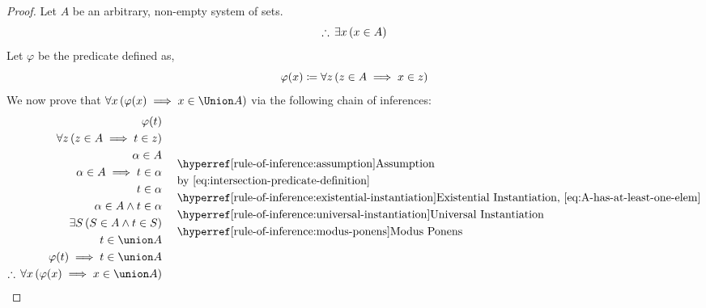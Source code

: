 \begin{proof}
    Let \( A \) be an arbitrary, non-empty system of sets.
    \begin{equation}
        \label{eq:A-has-at-least-one-elem}
        \therefore \, \exists x \, \mleft( x \in A \mright)
    \end{equation}
    Let \( \varphi \) be the predicate defined as,
    \begin{equation}
        \label{eq:intersection-predicate-definition}
        \varphi(x) \coloneq \forall z \, \mleft( z \in A \implies x \in z \mright)
    \end{equation}
    We now prove that \( \forall x \, \mleft( \varphi(x) \implies x \in \Union A \mright) \)
    via the following chain of inferences:
    \begin{equation*}
        \begin{aligned}
            \varphi(t)&\\
            \forall z \, \mleft( z \in A \implies t \in z \mright)&\\
            \alpha \in A& \\
            \alpha \in A \implies t \in \alpha & \\
            t \in \alpha& \\
            \alpha \in A \land t \in \alpha& \\
            \exists S \, \mleft( S \in A \land t \in S \mright)& \\
            t \in \union A& \\
            \varphi(t) \implies t \in \union A& \\
            \therefore \, \forall x \, \mleft( \varphi(x) \implies x \in \union A \mright)& \\
        \end{aligned}
        \text{  }
        \begin{aligned}
            &\quad\text{\aref{rule-of-inference:assumption}{Assumption}} \\
            &\quad\text{by \eqref{eq:intersection-predicate-definition}} \\
            &\quad\text{\aref{rule-of-inference:existential-instantiation}{Existential Instantiation}, \eqref{eq:A-has-at-least-one-elem}} \\
            &\quad\text{\aref{rule-of-inference:universal-instantiation}{Universal Instantiation}} \\
            &\quad\text{\aref{rule-of-inference:modus-ponens}{Modus Ponens}} \\

\end{aligned}
\end{equation*}
\end{proof}
